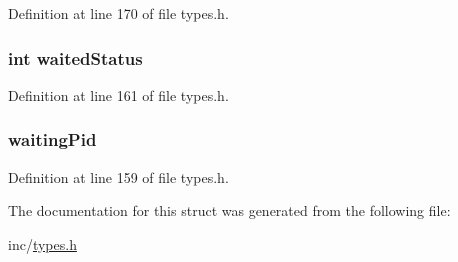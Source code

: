 Definition at line 170 of file types.h.

\hypertarget{structprocess__t_a302f417bbfe3271770ffef16d2b53959}{
\subsubsection[{waitedStatus}]{\setlength{\rightskip}{0pt plus 5cm}int {\bf waitedStatus}}}
\label{structprocess__t_a302f417bbfe3271770ffef16d2b53959}


Definition at line 161 of file types.h.

\hypertarget{structprocess__t_a221846b944d7ce2a181f8a1486c44d85}{
\subsubsection[{waitingPid}]{ {\bf waitingPid}}}
\label{structprocess__t_a221846b944d7ce2a181f8a1486c44d85}


Definition at line 159 of file types.h.



The documentation for this struct was generated from the following file:\begin{DoxyCompactItemize}
\item 
inc/\hyperlink{types_8h}{types.h}\end{DoxyCompactItemize}

